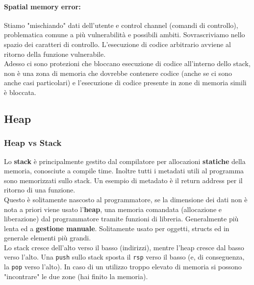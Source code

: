 \paragraph{Spatial memory error:} Stiamo "mischiando" dati dell'utente e control channel (comandi di controllo), problematica comune a più vulnerabilità e possibili ambiti. Sovrascriviamo nello spazio dei caratteri di controllo. L'esecuzione di codice arbitrario avviene al ritorno della funzione vulnerabile.\\

Adesso ci sono protezioni che bloccano esecuzione di codice all'interno dello stack, non è una zona di memoria che dovrebbe contenere codice (anche se ci sono anche casi particolari) e l'esecuzione di codice presente in zone di memoria simili è bloccata.\\


\newpage

\subsection{Heap}

\subsubsection{Heap vs Stack}
Lo \textbf{stack} è principalmente gestito dal compilatore per allocazioni \textbf{statiche} della memoria, conosciute a compile time. Inoltre tutti i metadati utili al programma sono memorizzati sullo stack. Un esempio di metadato è il return address per il ritorno di una funzione. \\

Questo è solitamente nascosto al programmatore, se la dimensione dei dati non è nota a priori viene usato l'\textbf{heap}, una memoria comandata (allocazione e liberazione) dal programmatore tramite funzioni di libreria. Generalmente più lenta ed a \textbf{gestione manuale}.  Solitamente usato per oggetti, structs ed in generale elementi più grandi.\\

Lo stack cresce dell'alto verso il basso (indirizzi), mentre l'heap cresce dal basso verso l'alto. Una \texttt{push} sullo stack sposta il \texttt{rsp} verso il basso (e, di conseguenza, la \texttt{pop} verso l'alto). In caso di un utilizzo troppo elevato di memoria si possono "incontrare" le due zone (hai finito la memoria).\\

